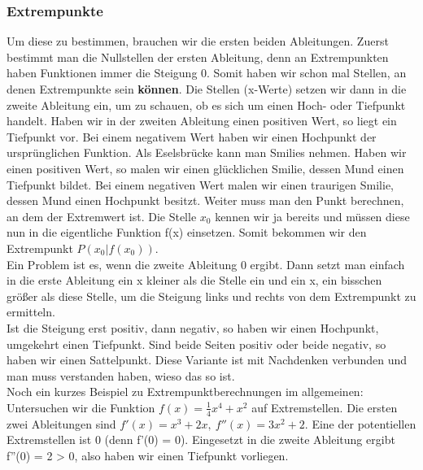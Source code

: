 	

	\subsubsection{Extrempunkte}
		Um diese zu bestimmen,  brauchen wir die ersten beiden Ableitungen. Zuerst
		bestimmt man die Nullstellen der ersten Ableitung, denn an Extrempunkten haben
		Funktionen immer die Steigung 0. Somit haben wir schon mal Stellen, an denen
		Extrempunkte sein \textbf{können}. Die Stellen (x-Werte) setzen wir dann in
		die zweite Ableitung ein, um zu schauen, ob es sich um einen Hoch- oder
		Tiefpunkt handelt. Haben wir in der zweiten Ableitung einen positiven Wert, so
		liegt ein Tiefpunkt vor. Bei einem negativem Wert haben wir einen Hochpunkt
		der ursprünglichen Funktion. Als Eselsbrücke kann man Smilies nehmen. Haben
		wir einen positiven Wert, so malen wir einen glücklichen Smilie, dessen Mund
		einen Tiefpunkt bildet. Bei einem negativen Wert malen wir einen traurigen
		Smilie, dessen Mund einen Hochpunkt besitzt. Weiter muss man den Punkt
		berechnen, an dem der Extremwert ist. Die Stelle \(x_0\) kennen wir ja bereits
		und müssen diese nun in die eigentliche Funktion f(x) einsetzen. Somit
		bekommen wir den Extrempunkt \(P(x_0|f(x_0))\).\\
		Ein Problem ist es, wenn die zweite Ableitung 0 ergibt. Dann setzt man einfach
		in die erste Ableitung ein x kleiner als die Stelle ein und ein x, ein
		bisschen größer als diese Stelle, um die Steigung links und rechts von dem
		Extrempunkt zu ermitteln. \\
		Ist die Steigung erst positiv, dann negativ, so haben wir einen Hochpunkt,
		umgekehrt einen Tiefpunkt. Sind beide Seiten positiv oder beide negativ, so
		haben wir einen Sattelpunkt. Diese Variante ist mit Nachdenken verbunden und
		man muss verstanden haben, wieso das so ist.\\
		Noch ein kurzes Beispiel zu Extrempunktberechnungen im allgemeinen:
		Untersuchen wir die Funktion \(f(x)=\frac{1}{4}x^4+x^2\) auf Extremstellen.
		Die ersten zwei Ableitungen sind \(f'(x)=x^3+2x,\ f''(x)=3x^2+2\). Eine der
		potentiellen Extremstellen ist 0 (denn f'(0) = 0). Eingesetzt in die zweite
		Ableitung ergibt f''(0) = 2 > 0, also haben wir einen Tiefpunkt vorliegen.
		
